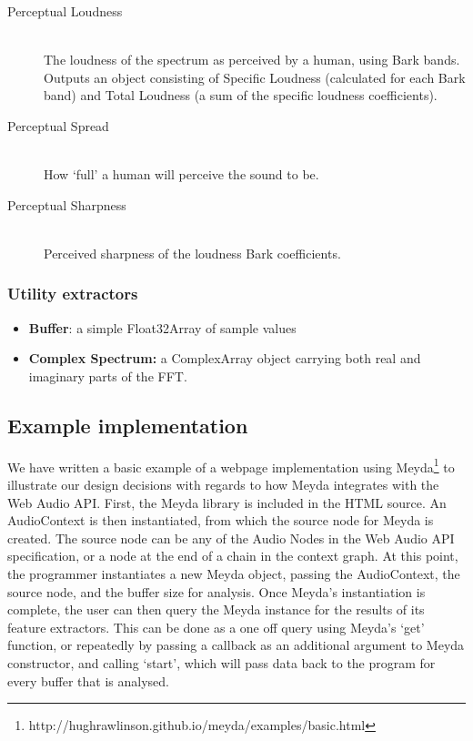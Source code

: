 \documentclass{sig-alternate}
\begin{document}
\begin{description}
       \item[Perceptual Loudness]\hfill \\
       The loudness of the spectrum as perceived by a human, using Bark bands. Outputs an object consisting of Specific Loudness (calculated for each Bark 		   band) and Total Loudness (a sum of the specific loudness coefficients).
       \item[Perceptual Spread]\hfill \\
       How `full' a human will perceive the sound to be.
       \item[Perceptual Sharpness]\hfill \\
       Perceived sharpness of the loudness Bark coefficients.
\end{description}

\subsubsection{Utility extractors}
\begin{itemize}
	   \item \textbf{Buffer}: a simple Float32Array of sample values
	   \item \textbf{Complex Spectrum:} a ComplexArray object carrying both real and imaginary parts of the FFT.
\end{itemize}

\subsection{Example implementation}
We have written a basic example of a webpage implementation using Meyda\footnote{http://hughrawlinson.github.io/meyda/examples/basic.html} to illustrate our design decisions with regards to how Meyda integrates with the Web Audio API. First, the Meyda library is included in the HTML source. An AudioContext is then instantiated, from which the source node for Meyda is created. The source node can be any of the Audio Nodes in the Web Audio API specification, or a node at the end of a chain in the context graph. At this point, the programmer instantiates a new Meyda object, passing the AudioContext, the source node, and the buffer size for analysis. Once Meyda's instantiation is complete, the user can then query the Meyda instance for the results of its feature extractors. This can be done as a one off query using Meyda's `get' function, or repeatedly by passing a callback as an additional argument to Meyda constructor, and calling `start', which will pass data back to the program for every buffer that is analysed.
\end{document}

